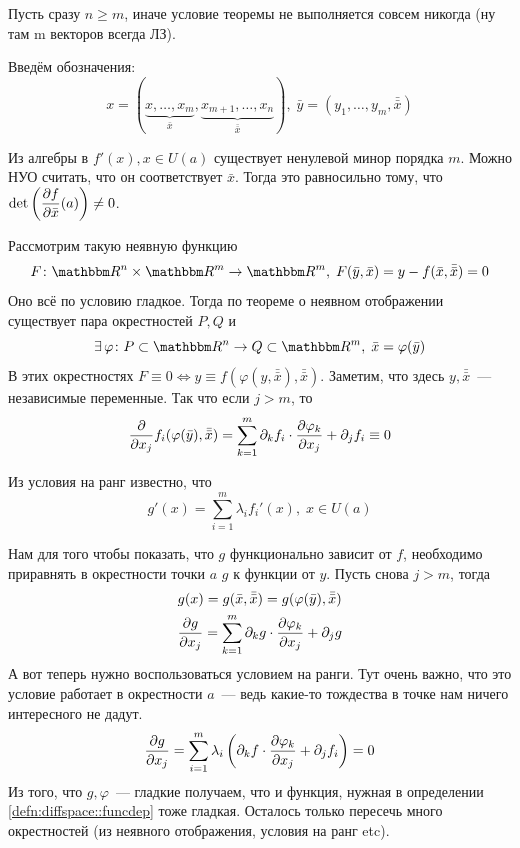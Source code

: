 \documentclass[12pt,timbord]{../../../notes}
\begin{document}
\begin{ittproof}
  Пусть сразу $n \geqslant m$, иначе условие теоремы не выполняется совсем никогда (ну там m
  векторов всегда ЛЗ).

  Введём обозначения:
  \[
    x = (\underbrace{x, \dotsc, x_m}_{\bar{x}}, \underbrace{x_{m+1}, \dotsc,
    x_n}_{\bar{\bar{x}}}), \; \bar y = (y_1, \dotsc, y_m, \bar{\bar x})
  \]

  Из алгебры в $f'(x), x\in U(a)$ существует ненулевой минор порядка $m$. Можно НУО считать, что он
  соответствует $\bar x$. Тогда это равносильно тому, что $\displaystyle \det \left(\frac{\partial f}{\partial \bar
  x}(a)\right) \neq 0$.

  Рассмотрим такую неявную функцию 
  \[
    F \colon \R^n \times \R^m \to \R^m, \; F(\bar{y}, \bar{x}) = y - f(\bar{x}, \bar{\bar x}) = 0 
  \]
  Оно всё по условию гладкое.
  Тогда по теореме о неявном отображении существует пара окрестностей $P, Q$ и 
  \[
    \exists\,\varphi \colon P\subset \R^n \to Q\subset \R^m, \;  \bar x = \varphi(\bar y)
  \] 
  В этих окрестностях $F\equiv 0 \Leftrightarrow y \equiv f(\varphi(y, \bar{\bar x}), \bar{\bar x})$.
  Заметим, что здесь $y, \bar{\bar x}$~--- независимые переменные. Так что если $j > m$, то
  \[
    \frac{\partial }{\partial x_j} f_i(\varphi(\bar y), \bar{\bar x}) = \sum_{k=1}^m \partial_k{f_i} \cdot
    \frac{\partial \varphi_k}{\partial x_j} + \partial_j f_i \equiv 0
  \]

  Из условия на ранг известно, что 
  \[
    g'(x) = \sum_{i=1}^m \lambda_i f_i'(x), \; x\in U(a)
  \]

  Нам для того чтобы показать, что $g$ функционально зависит от $f$, необходимо приравнять в
  окрестности точки $a$ $g$ к функции от $y$. Пусть снова $j>m$, тогда 
  \begin{align*}
    & g(x) = g(\bar x, \bar{\bar x}) = g(\varphi(\bar y), \bar{\bar x}) \\
    &\frac{\partial g}{\partial x_j}  = \sum_{k=1}^m \partial_k g \cdot \frac{\partial \varphi_k}{\partial x_j} + \partial_j g 
  \end{align*}
  А вот теперь нужно воспользоваться условием на ранги. Тут очень важно, что это условие работает
  в окрестности $a$~--- ведь какие-то тождества в точке нам ничего интересного не дадут.
  \[
    \frac{\partial g}{\partial x_j}  = \sum_{i=1}^m \lambda_i \left(\partial_k f 
    \cdot \frac{\partial \varphi_k}{\partial x_j} + \partial_j f_i\right) = 0 
  \]
  Из того, что $g, \varphi$~--- гладкие получаем, что и функция, нужная в определении
  \ref{defn:diffspace::funcdep} тоже гладкая. 
  Осталось только пересечь много окрестностей (из неявного отображения, условия на ранг etc).
\end{ittproof}
\end{document}
